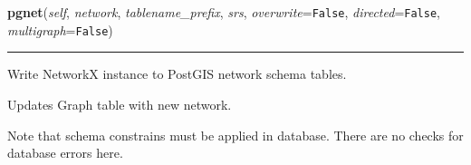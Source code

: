     \label{nx_pgnet:write:pgnet}

    \vspace{0.5ex}

\hspace{.8\funcindent}\begin{boxedminipage}{\funcwidth}

    \raggedright \textbf{pgnet}(\textit{self}, \textit{network}, \textit{tablename\_prefix}, \textit{srs}, \textit{overwrite}={\tt False}, \textit{directed}={\tt False}, \textit{multigraph}={\tt False})

    \vspace{-1.5ex}

    \rule{\textwidth}{0.5\fboxrule}
\setlength{\parskip}{2ex}
    Write NetworkX instance to PostGIS network schema tables.

    Updates Graph table with new network.

    Note that schema constrains must be applied in database. There are no 
    checks for database errors here.

\setlength{\parskip}{1ex}
    \end{boxedminipage}

